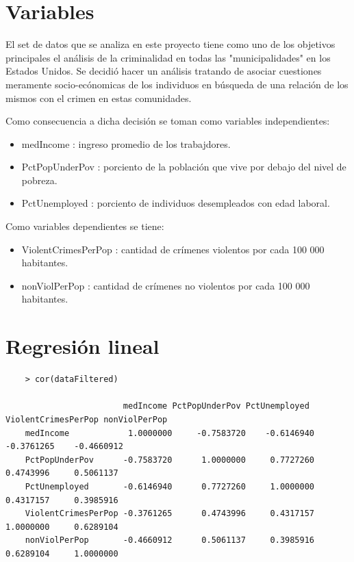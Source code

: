 \documentclass[a4paper,10pt,twocolumn]{article}
\begin{document}
\section{Variables}\label{sec:ex1.0}
El set de datos que se analiza en este proyecto tiene como uno de los objetivos principales el análisis de 
la criminalidad en todas las "municipalidades" en los Estados Unidos. Se decidió hacer un análisis tratando
 de asociar cuestiones meramente socio-ecónomicas de los individuos en búsqueda de una relación de los mismos con 
 el crimen en estas comunidades.

 Como consecuencia a dicha decisión se toman como variables independientes:
 \begin{itemize}
	 \item medIncome : ingreso promedio de los trabajdores.
	 \item PctPopUnderPov : porciento de la población que vive por debajo del nivel de pobreza.
	 \item PctUnemployed : porciento de individuos desempleados con edad laboral.	 
 \end{itemize}

 Como variables dependientes se tiene:
 \begin{itemize}
	 \item ViolentCrimesPerPop : cantidad de crímenes violentos por cada 100 000 habitantes.
	 \item nonViolPerPop : cantidad de crímenes no violentos por cada 100 000 habitantes.
 \end{itemize}
\section{Regresión lineal}\label{sec:ex1.1}

\begin{verbatim}
	> cor(dataFiltered)

						medIncome PctPopUnderPov PctUnemployed ViolentCrimesPerPop nonViolPerPop
	medIncome            1.0000000     -0.7583720    -0.6146940          -0.3761265    -0.4660912
	PctPopUnderPov      -0.7583720      1.0000000     0.7727260           0.4743996     0.5061137
	PctUnemployed       -0.6146940      0.7727260     1.0000000           0.4317157     0.3985916
	ViolentCrimesPerPop -0.3761265      0.4743996     0.4317157           1.0000000     0.6289104
	nonViolPerPop       -0.4660912      0.5061137     0.3985916           0.6289104     1.0000000
\end{verbatim}
\end{document}
